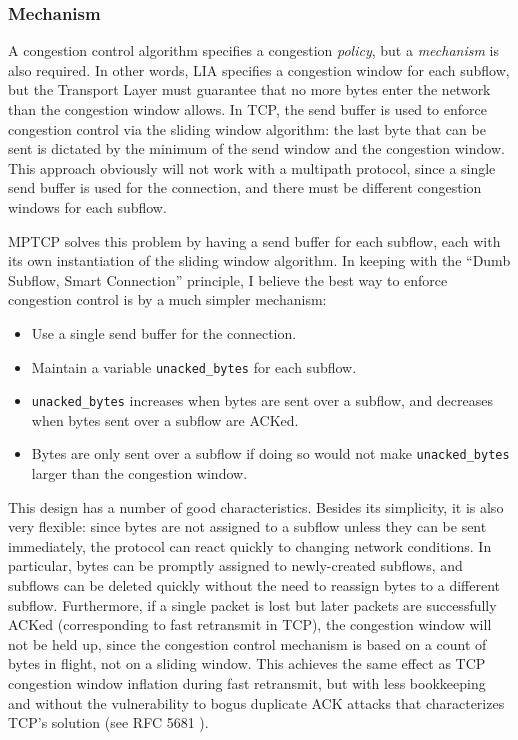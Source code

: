 \subsubsection{Mechanism}
A congestion control algorithm specifies a congestion \emph{policy}, but a \emph{mechanism} is also required. In other words, LIA specifies a congestion window for each subflow, but the Transport Layer must guarantee that no more bytes enter the network than the congestion window allows. In TCP, the send buffer is used to enforce congestion control via the sliding window algorithm: the last byte that can be sent is dictated by the minimum of the send window and the congestion window. This approach obviously will not work with a multipath protocol, since a single send buffer is used for the connection, and there must be different congestion windows for each subflow. 

MPTCP solves this problem by having a send buffer for each subflow, each with its own instantiation of the sliding window algorithm. In keeping with the ``Dumb Subflow, Smart Connection'' principle, I believe the best way to enforce congestion control is by a much simpler mechanism:

\begin{itemize}
  \item Use a single send buffer for the connection.
  \item Maintain a variable \texttt{unacked\_bytes} for each subflow.
  \item \texttt{unacked\_bytes} increases when bytes are sent over a subflow, and decreases when bytes sent over a subflow are ACKed.
  \item Bytes are only sent over a subflow if doing so would not make \texttt{unacked\_bytes} larger than the congestion window.
\end{itemize}

This design has a number of good characteristics. Besides its simplicity, it is also very flexible: since bytes are not assigned to a subflow unless they can be sent immediately, the protocol can react quickly to changing network conditions. In particular, bytes can be promptly assigned to newly-created subflows, and subflows can be deleted quickly without the need to reassign bytes to a different subflow. Furthermore, if a single packet is lost but later packets are successfully ACKed (corresponding to fast retransmit in TCP), the congestion window will not be held up, since the congestion control mechanism is based on a count of bytes in flight, not on a sliding window. This achieves the same effect as TCP congestion window inflation during fast retransmit, but with less bookkeeping and without the vulnerability to bogus duplicate ACK attacks that characterizes TCP's solution (see RFC 5681 \cite{rfc5681}).

